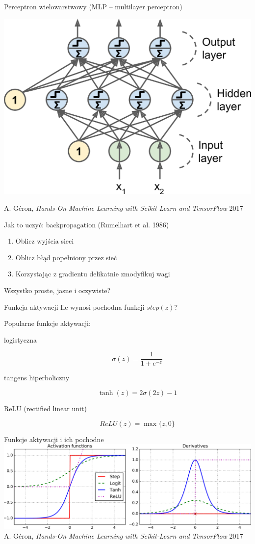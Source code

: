 \documentclass{sa}
\begin{document}
\begin{frame}{Perceptron wielowarstwowy (MLP -- multilayer perceptron)}
\begin{center}
\includegraphics[width=.8\textwidth]{mlp.png}
\end{center}
{\vfill\footnotesize A. Géron, \emph{Hands-On Machine Learning with Scikit-Learn and TensorFlow} 2017}
\end{frame}

\begin{frame}{Jak to uczyć: backpropagation (Rumelhart et al.  1986)}
\begin{enumerate}
\item Oblicz wyjścia sieci
\item Oblicz błąd popełniony przez sieć
\item Korzystając z gradientu delikatnie zmodyfikuj wagi
\end{enumerate}
\pause
\alert{Wszystko proste, jasne i oczywiste?}
\end{frame}

\begin{frame}{Funkcja aktywacji}
\alert{Ile wynosi pochodna funkcji $step(z)$?}

\pause
Popularne funkcje aktywacji:
\begin{description}
\item[logistyczna] \[ \sigma(z) = \frac{1}{1+e^{-z}} \]
\pause
\item[tangens hiperboliczny] \[ \tanh(z) = 2\sigma(2z) - 1 \]
\pause
\item[ReLU (rectified linear unit)] \[ ReLU(z) = \max\{z, 0\} \]
\end{description}
\end{frame}

\begin{frame}{Funkcje aktywacji i ich pochodne}
\includegraphics[width=\textwidth]{activation_functions.png}
{\vfill\footnotesize A. Géron, \emph{Hands-On Machine Learning with Scikit-Learn and TensorFlow} 2017}
\end{frame}
\end{document}
